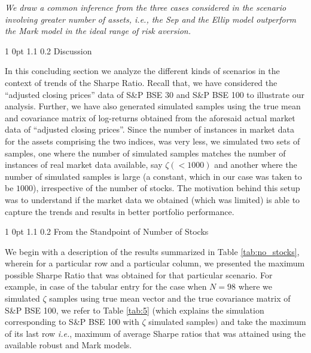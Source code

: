 \documentclass[12pt]{article}
\makeatletter
\numberwithin{equation}{section}
\renewcommand{\section}{
  \@startsection
  {section}%
  {1}%
  {0pt}%
  {1.1\baselineskip}%
  {0.2\baselineskip}%
  {\sc \centering}%
}
\renewcommand{\subsection}{
  \@startsection
  {subsection}%
  {1}%
  {0pt}%
  {1.1\baselineskip}%
  {0.2\baselineskip}%
  {\sc \centering}%
}
\makeatother
\begin{document}
\textit{We draw a common inference from the three cases considered in the scenario involving greater number of assets, \textit{i.e.}, the Sep and the Ellip model outperform the Mark model in the ideal range of risk aversion.}

\section{Discussion}
\label{Discussion}

In this concluding section we analyze the different kinds of scenarios in the context of trends of the Sharpe Ratio. Recall that, we have considered the ``adjusted closing prices'' data of S\&P BSE 30 and S\&P BSE 100 to illustrate our analysis. Further, we have also generated simulated samples using the true mean and covariance matrix of log-returns obtained from the aforesaid actual market data of ``adjusted closing prices''. Since the number of instances in market data for the assets comprising the two indices, was very less, we simulated two sets of samples, one where the number of simulated samples matches the number of instances of real market data available, say $\zeta(<1000)$ and another where the number of simulated samples is large (a constant, which in our case was taken to be $1000$), irrespective of the number of stocks. The motivation behind this setup was to understand if the market data we obtained (which was limited) is able to capture the trends and results in better portfolio performance.

\subsection{From the Standpoint of Number of Stocks}

We begin with a description of the results summarized in Table \ref{tab:no_stocks}, wherein for a particular row and a particular column, we presented the maximum possible Sharpe Ratio that was obtained for that particular scenario. For example, in case of the tabular entry for the case when $N=98$ where we simulated $\zeta$ samples using true mean vector and the true covariance matrix of S\&P BSE 100, we refer to Table \ref{tab:5} (which explains the simulation corresponding to S\&P BSE 100 with $\zeta$ simulated samples) and take the maximum of its last row \textit{i.e.}, maximum of average Sharpe ratios that was attained using the available robust and Mark models.
\end{document}

